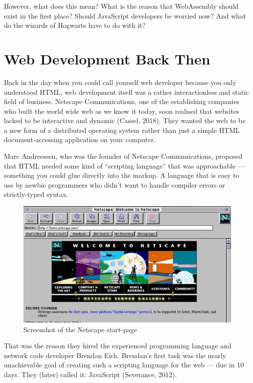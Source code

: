 \documentclass[11pt]{article}
\begin{document}
However, what does this mean? What is the reason that WebAssembly should exist in the first place? Should JavaScript developers be worried now? And what do the wizards of Hogwarts have to do with it?

\section{Web Development Back Then}
\label{sec:back-then}

Back in the day when you could call yourself web developer because you only understood HTML, web development itself was a rather interactionless and static field of business. Netscape Communications, one of the establishing companies who built the world wide web as we know it today, soon realised that websites lacked to be interactive and dynamic (Cassel, 2018). They wanted the web to be a new form of a distributed operating system rather than just a simple HTML document-accessing application on your computer.

Marc Andreessen, who was the founder of Netscape Communications, proposed that HTML needed some kind of “scripting language” that was approachable — something you could glue directly into the markup. A language that is easy to use by newbie programmers who didn’t want to handle compiler errors or strictly-typed syntax.

\begin{figure}[ht]
  \centering
  \includegraphics[width=\textwidth]{figures/002.jpg}
  \caption{Screenshot of the Netscape start-page \citep{npr_home_nodate}}
  \label{fig:netscape}
\end{figure}

That was the reason they hired the experienced programming language and network code developer Brendan Eich. Brendan’s first task was the nearly unachievable goal of creating such a scripting language for the web — due in 10 days. They (later) called it: JavaScript (Severance, 2012).
\end{document}
